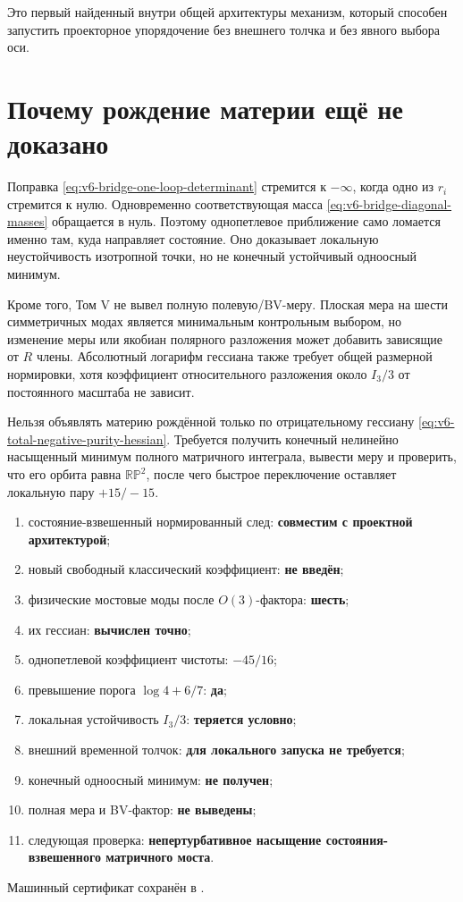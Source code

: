Это первый найденный внутри общей архитектуры механизм, который способен
запустить проекторное упорядочение без внешнего толчка и без явного выбора
оси.

\section{Почему рождение материи ещё не доказано}

Поправка \eqref{eq:v6-bridge-one-loop-determinant} стремится к
$-\infty$, когда одно из $r_i$ стремится к нулю. Одновременно
соответствующая масса \eqref{eq:v6-bridge-diagonal-masses} обращается в
нуль. Поэтому однопетлевое приближение само ломается именно там, куда
направляет состояние. Оно доказывает локальную неустойчивость изотропной
точки, но не конечный устойчивый одноосный минимум.

Кроме того, Том V не вывел полную полевую/BV-меру. Плоская мера на шести
симметричных модах является минимальным контрольным выбором, но изменение
меры или якобиан полярного разложения может добавить зависящие от $R$
члены. Абсолютный логарифм гессиана также требует общей размерной
нормировки, хотя коэффициент относительного разложения около $I_3/3$ от
постоянного масштаба не зависит.

\begin{nogocriterion}
Нельзя объявлять материю рождённой только по отрицательному гессиану
\eqref{eq:v6-total-negative-purity-hessian}. Требуется получить конечный
нелинейно насыщенный минимум полного матричного интеграла, вывести меру и
проверить, что его орбита равна $\mathbb{RP}^2$, после чего быстрое переключение оставляет
локальную пару $+15/-15$.
\end{nogocriterion}

\begin{protocol}
\begin{enumerate}
 \item состояние-взвешенный нормированный след:
 \textbf{совместим с проектной архитектурой};
 \item новый свободный классический коэффициент:
 \textbf{не введён};
 \item физические мостовые моды после $O(3)$-фактора:
 \textbf{шесть};
 \item их гессиан:
 \textbf{вычислен точно};
 \item однопетлевой коэффициент чистоты:
 \textbf{$-45/16$};
 \item превышение порога $\log4+6/7$:
 \textbf{да};
 \item локальная устойчивость $I_3/3$:
 \textbf{теряется условно};
 \item внешний временной толчок:
 \textbf{для локального запуска не требуется};
 \item конечный одноосный минимум:
 \textbf{не получен};
 \item полная мера и BV-фактор:
 \textbf{не выведены};
 \item следующая проверка:
 \textbf{непертурбативное насыщение состояния-взвешенного матричного моста}.
\end{enumerate}
\end{protocol}

Машинный сертификат сохранён в
.